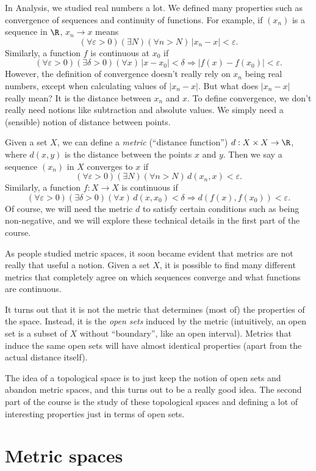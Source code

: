 \documentclass[a4paper]{article}
\begin{document}
In Analysis, we studied real numbers a lot. We defined many properties such as convergence of sequences and continuity of functions. For example, if $(x_n)$ is a sequence in $\R$, $x_n \to x$ means
\[
  (\forall \varepsilon > 0)(\exists N)(\forall n > N)\, |x_n - x| < \varepsilon.
\]
Similarly, a function $f$ is continuous at $x_0$ if
\[
  (\forall \varepsilon > 0)(\exists \delta > 0)(\forall x)\,|x - x_0| < \delta \Rightarrow  |f(x) - f(x_0)| < \varepsilon.
\]
However, the definition of convergence doesn't really rely on $x_n$ being real numbers, except when calculating values of $|x_n - x|$. But what does $|x_n - x|$ really mean? It is the distance between $x_n$ and $x$. To define convergence, we don't really need notions like subtraction and absolute values. We simply need a (sensible) notion of distance between points.

Given a set $X$, we can define a \emph{metric} (``distance function'') $d: X\times X\to \R$, where $d(x, y)$ is the distance between the points $x$ and $y$. Then we say a sequence $(x_n)$ in $X$ converges to $x$ if
\[
  (\forall \varepsilon > 0)(\exists N)(\forall n > N)\, d(x_n, x) < \varepsilon.
\]
Similarly, a function $f: X\to X$ is continuous if
\[
  (\forall \varepsilon > 0)(\exists \delta > 0)(\forall x)\,d(x, x_0) < \delta \Rightarrow  d(f(x), f(x_0)) < \varepsilon.
\]
Of course, we will need the metric $d$ to satisfy certain conditions such as being non-negative, and we will explore these technical details in the first part of the course.

As people studied metric spaces, it soon became evident that metrics are not really that useful a notion. Given a set $X$, it is possible to find many different metrics that completely agree on which sequences converge and what functions are continuous.

It turns out that it is not the metric that determines (most of) the properties of the space. Instead, it is the \emph{open sets} induced by the metric (intuitively, an open set is a subset of $X$ without ``boundary'', like an open interval). Metrics that induce the same open sets will have almost identical properties (apart from the actual distance itself).

The idea of a topological space is to just keep the notion of open sets and abandon metric spaces, and this turns out to be a really good idea. The second part of the course is the study of these topological spaces and defining a lot of interesting properties just in terms of open sets.

\section{Metric spaces}
\end{document}
